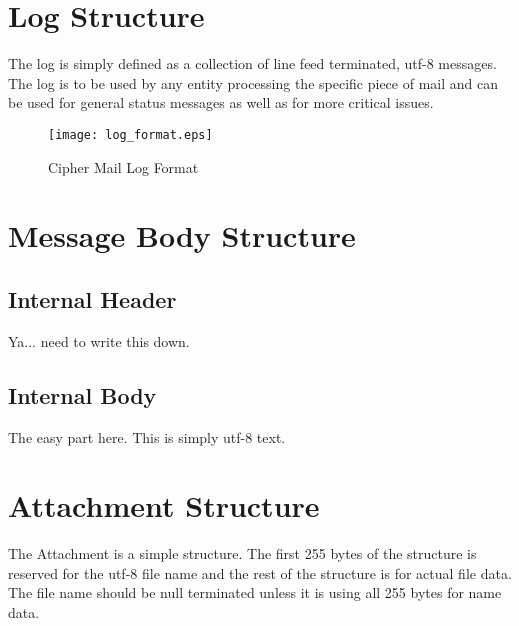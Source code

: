 \documentclass[a4paper,11pt]{IEEEtran}
\begin{document}
\section{Log Structure}
The log is simply defined as a collection of line feed terminated, utf-8 messages. The log is to be used by any entity processing the specific piece of mail and can be used for general status messages as well as for more critical issues.
\begin{figure}[H]
\centering
\texttt{[image: log\_format.eps]}
\caption{Cipher Mail Log Format}
\end{figure}

\section{Message Body Structure}
\subsection{Internal Header}
Ya... need to write this down.
\subsection{Internal Body}
The easy part here. This is simply utf-8 text.

\section{Attachment Structure}
The Attachment is a simple structure. The first 255 bytes of the structure is reserved for the utf-8 file name and the rest of the structure is for actual file data. The file name should be null terminated unless it is using all 255 bytes for name data.
\end{document}
